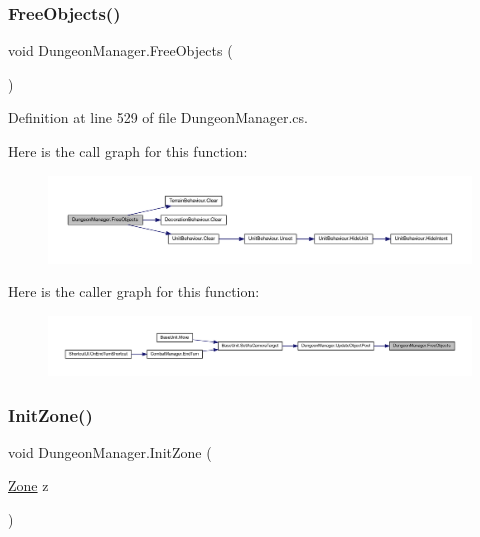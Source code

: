 \subsubsection{\texorpdfstring{FreeObjects()}{FreeObjects()}}
{\footnotesize\ttfamily void Dungeon\+Manager.\+Free\+Objects (\begin{DoxyParamCaption}{ }\end{DoxyParamCaption})}



Definition at line 529 of file Dungeon\+Manager.\+cs.

Here is the call graph for this function\+:
\nopagebreak
\begin{figure}[H]
\begin{center}
\leavevmode
\includegraphics[width=350pt]{class_dungeon_manager_ab7edf3b19e13892178a34ece10f4c5d5_cgraph}
\end{center}
\end{figure}
Here is the caller graph for this function\+:
\nopagebreak
\begin{figure}[H]
\begin{center}
\leavevmode
\includegraphics[width=350pt]{class_dungeon_manager_ab7edf3b19e13892178a34ece10f4c5d5_icgraph}
\end{center}
\end{figure}
\mbox{\label{class_dungeon_manager_afc7ff9dc122b876f72a4f238496f3a26}} 
\subsubsection{\texorpdfstring{InitZone()}{InitZone()}}
{\footnotesize\ttfamily void Dungeon\+Manager.\+Init\+Zone (\begin{DoxyParamCaption}\item[{\mbox{\hyperlink{class_dungeon_manager_a6558d4a01889674bf25c798f1b90a431}{Zone}}}]{z }\end{DoxyParamCaption})}



